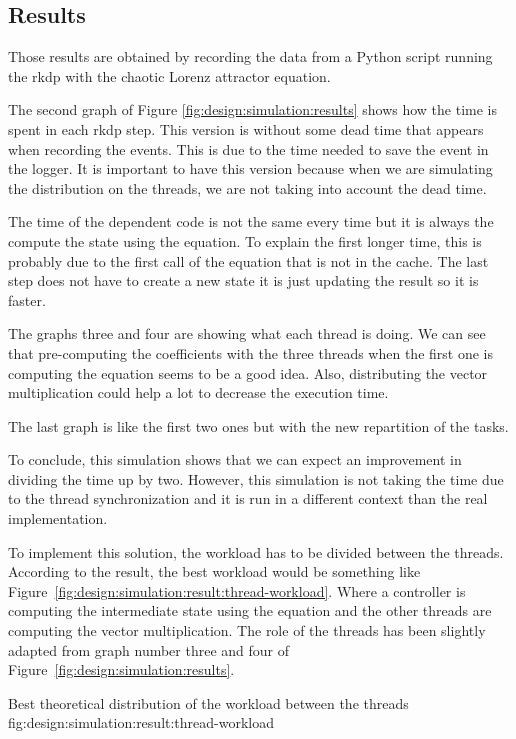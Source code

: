 \subsection{Results}
\label{ch:design:simulation:results}

Those results are obtained by recording the data from a Python script running
the \acrshort{rkdp} with the chaotic Lorenz attractor equation.

The second graph of Figure \ref{fig:design:simulation:results} shows
how the time is spent in each \acrshort{rkdp} step.
This version is without some dead time that appears when recording the events.
This is due to the time needed to save the event in the logger.
It is important to have this version because when we are simulating the
distribution on the threads, we are not taking into account the dead time.

The time of the dependent code is not the same every time but it is always the
compute the state using the equation.
To explain the first longer time, this is probably due to the first call of the
equation that is not in the cache.
The last step does not have to create a new state it is just updating the
result so it is faster.

The graphs three and four are showing what each thread is doing.
We can see that pre-computing the coefficients with the three threads when the
first one is computing the equation seems to be a good idea.
Also, distributing the vector multiplication could help a lot to decrease the
execution time.

The last graph is like the first two ones but with the new repartition of the
tasks.

To conclude, this simulation shows that we can expect an improvement in dividing
the time up by two.
However, this simulation is not taking the time due to the thread
synchronization and it is run in a different context than the real implementation.

To implement this solution, the workload has to be divided between the threads.
According to the result, the best workload would be something like Figure~\ref{fig:design:simulation:result:thread-workload}.
Where a controller is computing the intermediate state using the equation and the
other threads are computing the vector multiplication.
The role of the threads has been slightly adapted from graph number three and
four of Figure~\ref{fig:design:simulation:results}.

        {Best theoretical distribution of the workload between the threads}
        {fig:design:simulation:result:thread-workload}

